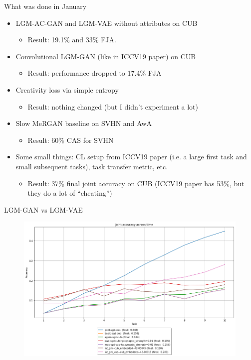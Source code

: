 \documentclass[10pt]{beamer}
\begin{document}
\begin{frame}{What was done in January}
    \begin{itemize}
        \item\pause LGM-AC-GAN and LGM-VAE without attributes on CUB
        \begin{itemize}
            \item Result: 19.1\% and 33\% FJA.
        \end{itemize}
        \item\pause Convolutional LGM-GAN (like in ICCV19 paper) on CUB
        \begin{itemize}
            \item Result: performance dropped to 17.4\% FJA
        \end{itemize}
        \item\pause Creativity loss via simple entropy
        \begin{itemize}
            \item Result: nothing changed (but I didn't experiment a lot)
        \end{itemize}
        \item\pause Slow MeRGAN baseline on SVHN and AwA
        \begin{itemize}
            \item Result: 60\% CAS for SVHN
        \end{itemize}
        \item\pause Some small things: CL setup from ICCV19 paper (i.e. a large first task and small subsequent tasks), task transfer metric, etc.
        \begin{itemize}
            \item\pause Result: 37\% final joint accuracy on CUB (ICCV19 paper has 53\%, but they do a lot of ``cheating'')
        \end{itemize}
    \end{itemize}
\end{frame}

\begin{frame}{LGM-GAN vs LGM-VAE}
    \begin{figure}
        \centering
        \includegraphics[width=\textwidth]{images/lgm-gan_vs_lgm-vae.png}
    \end{figure}
\end{frame}
\end{document}
